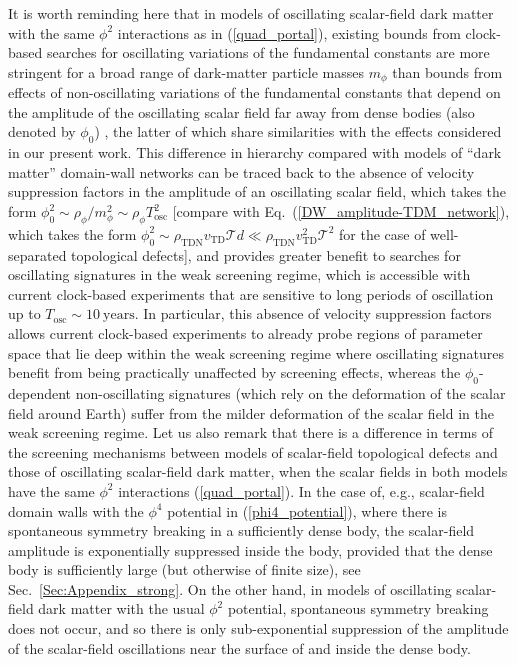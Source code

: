\documentclass[aps,prd,onecolumn,nofootinbib]{revtex4-2} %
\begin{document}
It is worth reminding here that in models of oscillating scalar-field dark matter with the same $\phi^2$ interactions as in (\ref{quad_portal}), existing bounds from clock-based searches for oscillating variations of the fundamental constants \cite{Stadnik_2015_DM-VFCs,Stadnik_2016_DM-clocks} are more stringent for a broad range of dark-matter particle masses $m_\phi$ than bounds from effects of non-oscillating variations of the fundamental constants that depend on the amplitude of the oscillating scalar field far away from dense bodies (also denoted by $\phi_0$) \cite{Hees_2018_DM-EP}, the latter of which share similarities with the effects considered in our present work. 
This difference in hierarchy compared with models of ``dark matter'' domain-wall networks can be traced back to the absence of velocity suppression factors in the amplitude of an oscillating scalar field, which takes the form $\phi_0^2 \sim \rho_\phi / m_\phi^2 \sim \rho_\phi T_\textrm{osc}^2$ [compare with Eq.~(\ref{DW_amplitude-TDM_network}), which takes the form $\phi_0^2 \sim \rho_\textrm{TDN} v_\textrm{TD} \mathcal{T} d \ll \rho_\textrm{TDN} v_\textrm{TD}^2 \mathcal{T}^2$ for the case of well-separated topological defects], and provides greater benefit to searches for oscillating signatures in the weak screening regime, which is accessible with current clock-based experiments that are sensitive to long periods of oscillation up to $T_\textrm{osc} \sim 10~\textrm{years}$. 
In particular, this absence of velocity suppression factors allows current clock-based experiments to already probe regions of parameter space that lie deep within the weak screening regime where oscillating signatures benefit from being practically unaffected by screening effects, whereas the $\phi_0$-dependent non-oscillating signatures (which rely on the deformation of the scalar field around Earth) suffer from the milder deformation of the scalar field in the weak screening regime. 
Let us also remark that there is a difference in terms of the screening mechanisms between models of scalar-field topological defects and those of oscillating scalar-field dark matter, when the scalar fields in both models have the same $\phi^2$ interactions (\ref{quad_portal}). 
In the case of, e.g., scalar-field domain walls with the $\phi^4$ potential in (\ref{phi4_potential}), where there is spontaneous symmetry breaking in a sufficiently dense body, the scalar-field amplitude is exponentially suppressed inside the body, provided that the dense body is sufficiently large (but otherwise of finite size), see Sec.~\ref{Sec:Appendix_strong}. 
On the other hand, in models of oscillating scalar-field dark matter with the usual $\phi^2$ potential, spontaneous symmetry breaking does not occur, and so there is only sub-exponential suppression of the amplitude of the scalar-field oscillations near the surface of and inside the dense body. 
\end{document}
